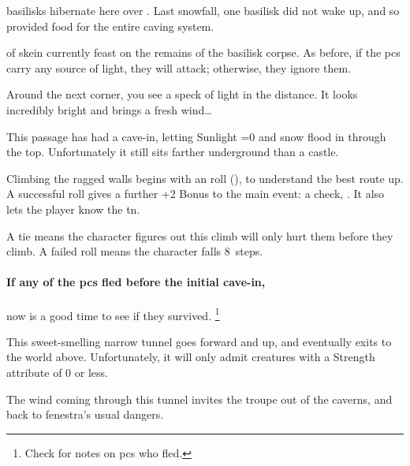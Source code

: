 \begin{multicols}{2}
\else
  \Glspl{basilisk} hibernate here over .
  Last snowfall, one \gls{basilisk} did not wake up, and so provided food for the entire caving system.

   of skein currently feast on the remains of the \gls{basilisk} corpse.
  As before, if the \glspl{pc} carry any source of light, they will attack; otherwise, they ignore them.

  \skeinSwarm
\fi

\begin{boxtext}
  Around the next corner, you see a speck of light in the distance.
  It looks incredibly bright and brings a fresh wind\ldots
\end{boxtext}



This passage has had a cave-in, letting Sunlight \ifnum\value{temperature}=0 and snow \fi flood in through the top.
Unfortunately it still sits farther underground than a castle.

Climbing the ragged walls begins with an  roll (\tn[10]), to understand the best route up.
A successful roll gives a further +2 Bonus to the main event: a  check, \tn[14].
It also lets the player know the \gls{tn}.

A tie means the character figures out this climb will only hurt them before they climb.
A failed roll means the character falls 8~\glspl{step}.%

\paragraph{If any of the \glspl{pc} fled before the initial cave-in,}
now is a good time to see if they survived.%
\footnote{Check  for notes on \glspl{pc} who fled.}





This sweet-smelling narrow tunnel goes forward and up, and eventually exits to the world above.
Unfortunately, it will only admit creatures with a Strength \gls{attribute} of 0 or less.



The wind coming through this tunnel invites the troupe out of the caverns, and back to \gls{fenestra}'s usual dangers.

\end{multicols}

